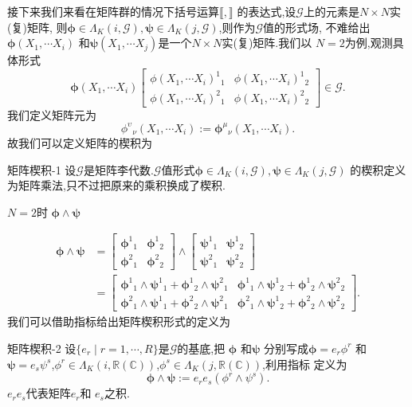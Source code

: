 \documentclass[../main.tex]{subfiles}
\begin{document}
接下来我们来看在矩阵群的情况下括号运算$\llbracket , \rrbracket $ 的表达式,设$\mathscr{G}$上的元素是$N\times N $实(复)矩阵, 则$\bm{\phi} \in \Lambda_K(i,\mathscr{G}), \bm{\psi} \in \Lambda_K(j,\mathscr{G}) $,则作为$\mathscr{G}$值的形式场,
不难给出$\bm{\phi}(X_1,\cdots X_i) $ 和$\bm{\psi}(X_1,\cdots X_j) $是一个$N \times N$实(复)矩阵.我们以 $N = 2$为例,观测具体形式 \[
  \bm{\phi}(X_1,\cdots X_i) \begin{bmatrix} \phi(X_1,\cdots X_i)^{1}{}_{1} & \phi(X_1,\cdots X_i)^{1}{}_{2} \\ \phi(X_1,\cdots X_i)^{2}{}_{1}& \phi(X_1,\cdots X_i)^{2}{}_{2} \end{bmatrix}  \in\mathscr{G} 
.\] 
我们定义矩阵元为\[
\phi^{\upsilon}{}_{\nu}(X_1,\cdots X_i) := \bm{\phi}^{\mu}{}_{\nu} (X_1,\cdots X_i) 
.\] 
故我们可以定义矩阵的楔积为
\begin{definition}
  {}{矩阵楔积-1}
  设$\mathscr{G}$是矩阵李代数.$\mathscr{G}$值形式$\bm{\phi} \in \Lambda_K(i,\mathscr{G}),\bm{\psi} \in \Lambda_K(j,\mathscr{G})  $ 的楔积定义为矩阵乘法,只不过把原来的乘积换成了楔积.
\end{definition}
\begin{example}
  $N = 2$时 $\bm{\phi} \wedge \bm{\psi}  $
\end{example}
\begin{align*}
  \bm{\phi} \wedge \bm{\psi}   &= \begin{bmatrix} \bm{\phi}^{1}{}_{1} & \bm{\phi}^{1}{}_{2} \\ \bm{\phi}^{2}{}_{1} & \bm{\phi}^{2}{}_{2} \end{bmatrix} \wedge
\begin{bmatrix} \bm{\psi}^{1}{}_{1} & \bm{\psi}^{1}{}_{2} \\ \bm{\psi}^{2}{}_{1} & \bm{\psi}^{2}{}_{2} \end{bmatrix}\\
                               &= \begin{bmatrix}\bm{\phi}^{1}{}_{1}\wedge \bm{\psi}^{1}{}_{1} + \bm{\phi}^{1}{}_{2} \wedge \bm{\psi}^{2}{}_{1}& \bm{\phi}^{1}{}_{1}\wedge \bm{\psi}^{1}{}_{2} + \bm{\phi}^{1}{}_{2} \wedge \bm{\psi}^{2}{}_{2}\\ \bm{\phi}^{2}{}_{1}\wedge \bm{\psi}^{1}{}_{1} + \bm{\phi}^{2}{}_{2} \wedge \bm{\psi}^{2}{}_{1}&\bm{\phi}^{2}{}_{1}\wedge \bm{\psi}^{1}{}_{2} + \bm{\phi}^{2}{}_{2} \wedge \bm{\psi}^{2}{}_{2}  \end{bmatrix}  
.\end{align*}
我们可以借助指标给出矩阵楔积形式的定义为
\begin{definition}
  {}{矩阵楔积-2}
  设$\{e_r \mid r = 1 , \cdots ,R\}$是$\mathscr{G}$的基底,把 $\bm{\phi} $ 和$\bm{\psi} $ 分别写成$\bm{\phi} = e_r {\phi}^r  $ 和$\bm{\psi} = e_s {\psi}^s  $,${\phi}^r \in \Lambda_K (i,\mathbb{R}(\mathbb{C})) $,${\phi}^s \in \Lambda_K (j,\mathbb{R}(\mathbb{C}))$,利用指标
  定义为\[
  \bm{\phi} \wedge \bm{\psi} := e_r e_s({\phi^r} \wedge {\psi}^s  )  
  .\] 
  $e_r e_s$代表矩阵$e_r$和 $e_s$之积.
\end{definition}
\end{document}
